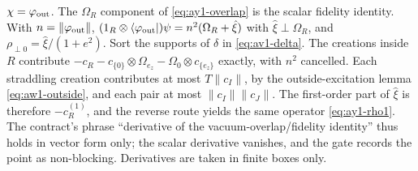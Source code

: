 $\chi=\varphi_{\rm out}$. The $\Omega_R$ component of \eqref{eq:ay1-overlap} is
the scalar fidelity identity. With $n=\lVert \varphi_{\rm out}\rVert$,
$(1_R\otimes\langle\varphi_{\rm out}|)\psi=n^2(\Omega_R+\hat\xi)$ with
$\hat\xi\perp\Omega_R$, and $\rho_{\perp0}=\hat\xi/(1+e^2)$. Sort the supports
of $\delta$ in \eqref{eq:av1-delta}. The creations inside $R$ contribute
$-c_R-c_{\{0\}}\otimes\Omega_{e_z}-\Omega_0\otimes c_{\{e_z\}}$ exactly, with
$n^2$ cancelled. Each straddling creation contributes at most
$T\lVert c_I\rVert$, by the outside-excitation lemma \eqref{eq:aw1-outside}, and
each pair at most $\lVert c_I\rVert \lVert c_J\rVert$. The first-order part of $\hat\xi$ is
therefore $-c^{(1)}_R$, and the reverse route yields the same operator
\eqref{eq:ay1-rho1}. The contract's phrase ``derivative of the
vacuum-overlap/fidelity identity'' thus holds in vector form only; the scalar
derivative vanishes, and the gate records the point as non-blocking.
Derivatives are taken in finite boxes only.


